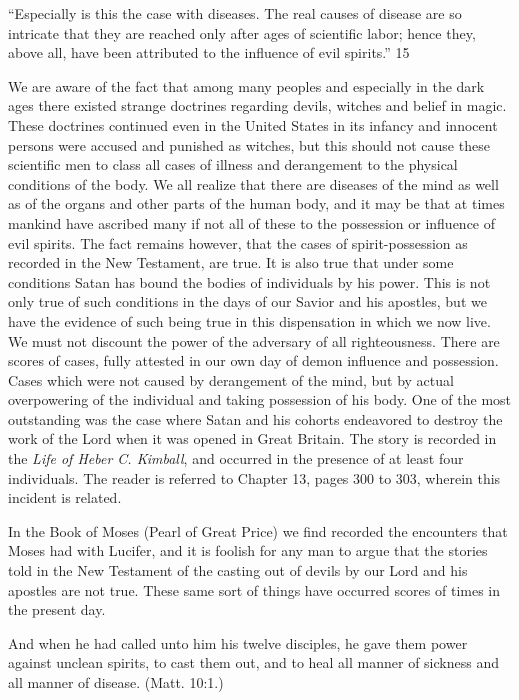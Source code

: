 ``Especially is this the case with diseases. The real causes of disease are so intricate that they
are reached only after ages of scientific labor; hence they, above all, have been attributed to
the influence of evil spirits.'' 15

We are aware of the fact that among many peoples and especially in the dark ages there
existed strange doctrines regarding devils, witches and belief in magic. These doctrines
continued even in the United States in its infancy and innocent persons were accused and
punished as witches, but this should not cause these scientific men to class all cases of illness
and derangement to the physical conditions of the body. We all realize that there are diseases
of the mind as well as of the organs and other parts of the human body, and it may be that at
times mankind have ascribed many if not all of these to the possession or influence of evil
spirits. The fact remains however, that the cases of spirit-possession as recorded in the New
Testament, are true. It is also true that under some conditions Satan has bound the bodies of
individuals by his power. This is not only true of such conditions in the days of our Savior
and his apostles, but we have the evidence of such being true in this dispensation in which we
now live. We must not discount the power of the adversary of all righteousness. There are
scores of cases, fully attested in our own day of demon influence and possession. Cases
which were not caused by derangement of the mind, but by actual overpowering of the
individual and taking possession of his body. One of the most outstanding was the case
where Satan and his cohorts endeavored to destroy the work of the Lord when it was opened
in Great Britain. The story is recorded in the \textit{Life of Heber C. Kimball}, and occurred in the
presence of at least four individuals. The reader is referred to Chapter 13, pages 300 to 303,
wherein this incident is related.

In the Book of Moses (Pearl of Great Price) we find recorded the encounters that Moses had
with Lucifer, and it is foolish for any man to argue that the stories told in the New Testament
of the casting out of devils by our Lord and his apostles are not true. These same sort of
things have occurred scores of times in the present day.

And when he had called unto him his twelve disciples, he gave them power against unclean
spirits, to cast them out, and to heal all manner of sickness and all manner of disease. (Matt.
10:1.)

